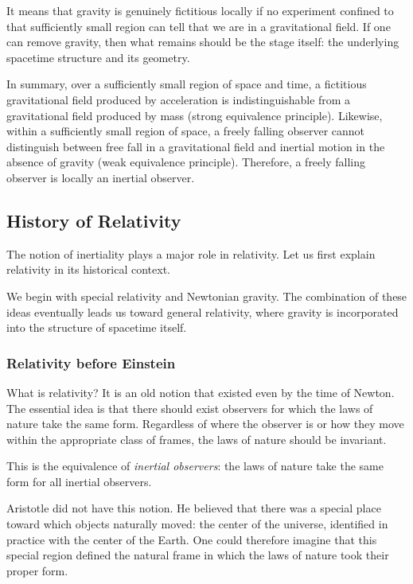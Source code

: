 			It means that gravity is genuinely fictitious locally if no experiment confined to that sufficiently small region can tell that we are in a gravitational field. If one can remove gravity, then what remains should be the stage itself: the underlying spacetime structure and its geometry.

			In summary, over a sufficiently small region of space and time, a fictitious gravitational field produced by acceleration is indistinguishable from a gravitational field produced by mass (strong equivalence principle).
			Likewise, within a sufficiently small region of space, a freely falling observer cannot distinguish between free fall in a gravitational field and inertial motion in the absence of gravity (weak equivalence principle). 
			Therefore, a freely falling observer is locally an inertial observer.
\subsection{History of Relativity}

	The notion of inertiality plays a major role in relativity. Let us first explain relativity in its historical context.

	We begin with special relativity and Newtonian gravity. The combination of these ideas eventually leads us toward general relativity, where gravity is incorporated into the structure of spacetime itself.

	\subsubsection{Relativity before Einstein}

		What is relativity? It is an old notion that existed even by the time of Newton. The essential idea is that there should exist observers for which the laws of nature take the same form. Regardless of where the observer is or how they move within the appropriate class of frames, the laws of nature should be invariant.

		This is the equivalence of \textit{inertial observers}: the laws of nature take the same form for all inertial observers.

		Aristotle did not have this notion. He believed that there was a special place toward which objects naturally moved: the center of the universe, identified in practice with the center of the Earth. One could therefore imagine that this special region defined the natural frame in which the laws of nature took their proper form.

